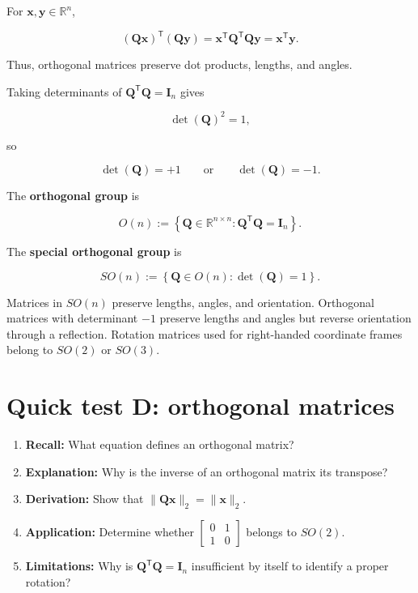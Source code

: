 \documentclass[
  australian,
  12pt,
  letterpaper,
  DIV=11,
  numbers=noendperiod,
  twoside]{scrreprt}
\providecommand{\tightlist}{%
  \setlength{\itemsep}{0pt}\setlength{\parskip}{0pt}}
\begin{document}
For \(\mathbf x,\mathbf y\in\mathbb R^n\),

\[
(\mathbf Q\mathbf x)^{\mathsf T}(\mathbf Q\mathbf y)
=
\mathbf x^{\mathsf T}\mathbf Q^{\mathsf T}\mathbf Q\mathbf y
=
\mathbf x^{\mathsf T}\mathbf y.
\]

Thus, orthogonal matrices preserve dot products, lengths, and angles.

Taking determinants of \(\mathbf Q^{\mathsf T}\mathbf Q=\mathbf I_n\)
gives

\[
\det(\mathbf Q)^2=1,
\]

so

\[
\det(\mathbf Q)=+1
\qquad\text{or}\qquad
\det(\mathbf Q)=-1.
\]

The \textbf{orthogonal group} is

\[
O(n)
\mathrel{:=}
\left\{\mathbf Q\in\mathbb R^{n\times n}:\mathbf Q^{\mathsf T}\mathbf Q=\mathbf I_n\right\}.
\]

The \textbf{special orthogonal group} is

\[
SO(n)
\mathrel{:=}
\left\{\mathbf Q\in O(n):\det(\mathbf Q)=1\right\}.
\]

Matrices in \(SO(n)\) preserve lengths, angles, and orientation.
Orthogonal matrices with determinant \(-1\) preserve lengths and angles
but reverse orientation through a reflection. Rotation matrices used for
right-handed coordinate frames belong to \(SO(2)\) or \(SO(3)\).

\section*{Quick test D: orthogonal
matrices}\label{quick-test-d-orthogonal-matrices}


\begin{enumerate}
\def\labelenumi{\arabic{enumi}.}
\tightlist
\item
  \textbf{Recall:} What equation defines an orthogonal matrix?
\item
  \textbf{Explanation:} Why is the inverse of an orthogonal matrix its
  transpose?
\item
  \textbf{Derivation:} Show that
  \(\|\mathbf Q\mathbf x\|_2=\|\mathbf x\|_2\).
\item
  \textbf{Application:} Determine whether
  \(\begin{bmatrix}0&1\\1&0\end{bmatrix}\) belongs to \(SO(2)\).
\item
  \textbf{Limitations:} Why is
  \(\mathbf Q^{\mathsf T}\mathbf Q=\mathbf I_n\) insufficient by itself
  to identify a proper rotation?
\end{enumerate}
\end{document}
